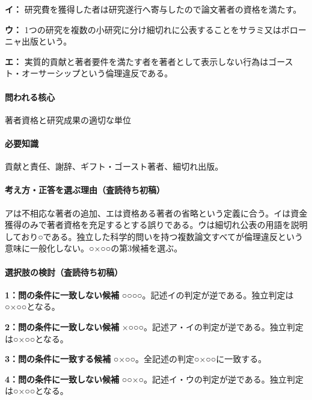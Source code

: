 \noindent\textbf{イ：} 研究費を獲得した者は研究遂行へ寄与したので論文著者の資格を満たす。\par

\noindent\textbf{ウ：} 1つの研究を複数の小研究に分け細切れに公表することをサラミ又はボローニャ出版という。\par

\noindent\textbf{エ：} 実質的貢献と著者要件を満たす者を著者として表示しない行為はゴースト・オーサーシップという倫理違反である。\par

\paragraph{問われる核心} 著者資格と研究成果の適切な単位

\paragraph{必要知識} 貢献と責任、謝辞、ギフト・ゴースト著者、細切れ出版。

\paragraph{考え方・正答を選ぶ理由（査読待ち初稿）} アは不相応な著者の追加、エは資格ある著者の省略という定義に合う。イは資金獲得のみで著者資格を充足するとする誤りである。ウは細切れ公表の用語を説明しており○である。独立した科学的問いを持つ複数論文すべてが倫理違反という意味に一般化しない。○×○○の第3候補を選ぶ。

\paragraph{選択肢の検討（査読待ち初稿）}\mbox{}\par

\noindent\textbf{1：問の条件に一致しない候補} ○○○○。記述イの判定が逆である。独立判定は○×○○となる。\par

\noindent\textbf{2：問の条件に一致しない候補} ×○○○。記述ア・イの判定が逆である。独立判定は○×○○となる。\par

\noindent\textbf{3：問の条件に一致する候補} ○×○○。全記述の判定○×○○に一致する。\par

\noindent\textbf{4：問の条件に一致しない候補} ○○×○。記述イ・ウの判定が逆である。独立判定は○×○○となる。\par


